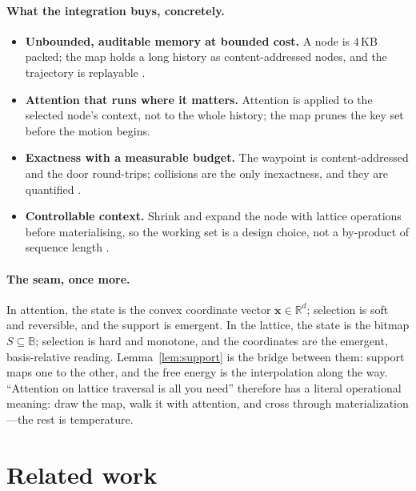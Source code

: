 \documentclass[11pt,a4paper]{article}
\theoremstyle{remark}
\newcommand{\Plane}{\ensuremath{\mathbb{B}}}          %
\newcommand{\xx}{\ensuremath{\mathbf{x}}}               %
\begin{document}
\paragraph{What the integration buys, concretely.}
\begin{itemize}[leftmargin=*,nosep]
  \item \textbf{Unbounded, auditable memory at bounded cost.} A node is $4$\,KB
    packed; the map holds a long history as content-addressed nodes, and the
    trajectory is replayable \cite{state2026,companion2026}.
  \item \textbf{Attention that runs where it matters.} Attention is applied to
    the selected node's context, not to the whole history; the map prunes the
    key set before the motion begins.
  \item \textbf{Exactness with a measurable budget.} The waypoint is
    content-addressed and the door round-trips; collisions are the only
    inexactness, and they are quantified \cite{kspace2026}.
  \item \textbf{Controllable context.} Shrink and expand the node with lattice
    operations before materialising, so the working set is a design choice, not
    a by-product of sequence length \cite{ctx2026}.
\end{itemize}

\paragraph{The seam, once more.} In attention, the state is the convex
coordinate vector $\xx\in\mathbb{R}^{d}$; selection is soft and reversible, and
the support is emergent. In the lattice, the state is the bitmap
$S\subseteq\Plane$; selection is hard and monotone, and the coordinates are the
emergent, basis-relative reading. Lemma~\ref{lem:support} is the bridge between
them: support maps one to the other, and the free energy is the interpolation
along the way. ``Attention on lattice traversal is all you need'' therefore has
a literal operational meaning: draw the map, walk it with attention, and cross
through materialization---the rest is temperature.

\section{Related work}
\label{sec:related}
\end{document}

